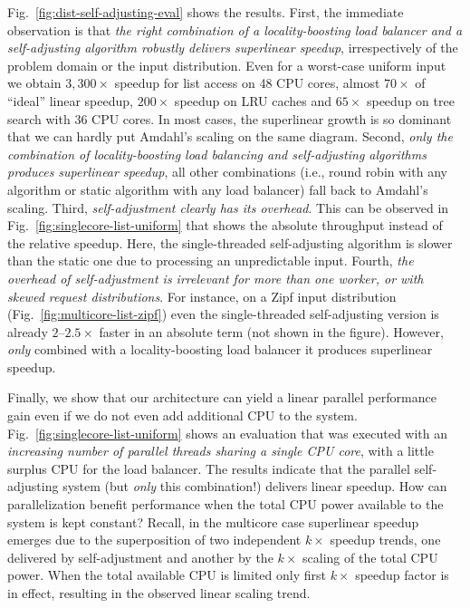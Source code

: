 Fig.~\ref{fig:dist-self-adjusting-eval} shows the results. First, the immediate observation is that \emph{the right combination of a locality-boosting load balancer and a self-adjusting algorithm robustly delivers superlinear speedup}, irrespectively of the problem domain or the input distribution. Even for a worst-case uniform input we obtain $3,300\times$ speedup for list access on 48 CPU cores, almost $70\times$ of ``ideal'' linear speedup, $200\times$ speedup on LRU caches and $65\times$ speedup on tree search with 36 CPU cores. In most cases, the superlinear growth is so dominant that we can hardly put Amdahl's scaling on the same diagram.  Second, \emph{only the combination of locality-boosting load balancing and self-adjusting algorithms produces superlinear speedup}, all other combinations (i.e., round robin with any algorithm or static algorithm with any load balancer) fall back to Amdahl's scaling.  Third, \emph{self-adjustment clearly has its overhead}. This can be observed in Fig.~\ref{fig:singlecore-list-uniform} that shows the absolute throughput instead of the relative speedup. Here, the single-threaded self-adjusting algorithm is slower than the static one due to processing an unpredictable input. Fourth, \emph{the overhead of self-adjustment is irrelevant for more than one worker, or with skewed request distributions}. For instance, on a Zipf input distribution (Fig.~\ref{fig:multicore-list-zipf}) even the single-threaded self-adjusting version is already $2$--$2.5\times$ faster in an absolute term (not shown in the figure). However, \emph{only} combined with a locality-boosting load balancer it produces superlinear speedup.

Finally, we show that our architecture can yield a linear parallel performance gain even if we do not even add additional CPU to the system. Fig.~\ref{fig:singlecore-list-uniform} shows an evaluation that was executed with an \emph{increasing number of parallel threads sharing a single CPU core}, with a little surplus CPU for the load balancer.  The results indicate that the parallel self-adjusting system (but \emph{only} this combination!) delivers linear speedup.  How can parallelization benefit performance when the total CPU power available to the system is kept constant? Recall, in the multicore case superlinear speedup emerges due to the superposition of two independent $k\times$ speedup trends, one delivered by self-adjustment and another by the $k\times$ scaling of the total CPU power. When the total available CPU is limited only first $k\times$ speedup factor is in effect, resulting in the observed linear scaling trend.

